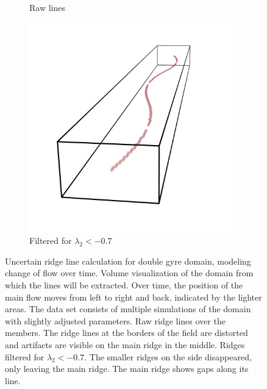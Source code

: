 \begin{figure}
\begin{subfigure}{0.33\textwidth}
        \caption{Raw lines}
        \label{fig:dgrawlines}
    \end{subfigure}
    \begin{subfigure}{0.33\textwidth}
        \includegraphics[trim=200 0 200 0, clip=true, width=\textwidth]{Images/RL3Dfilt.png}
        \caption{Filtered for $\lambda_2 < -0.7$}
        \label{fig:dgfiltered}
    \end{subfigure}
    \caption{Uncertain ridge line calculation for double gyre domain,
    modeling change of flow over time.  Volume
    visualization of the domain from which the lines will be extracted.
    Over time, the position of the main flow moves from left to right
    and back, indicated by the lighter areas. The data set consists of
    multiple simulations of the domain with slightly adjusted parameters.
     Raw ridge lines over the members. The ridge
    lines at the borders of the field are distorted and artifacts are
    visible on the main ridge in the middle. 
    Ridges filtered for $\lambda_2 < -0.7$. The smaller ridges on the
    side disappeared, only leaving the main ridge. The main ridge
    shows gaps along its line.}
    \label{fig:doublegyre}
\end{figure}

